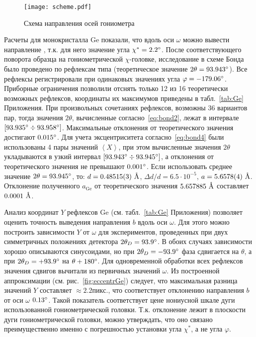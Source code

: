 \begin{figure}[ht!]
    \centering
    \texttt{[image: scheme.pdf]}
    \caption{Схема направления осей гониометра}%
    \label{fig:scheme}
\end{figure}

Расчеты для монокристалла Ge показали, что вдоль оси $\omega$ можно вывести направление , т.к. для него значение угла $\chi^\ast = 2.2^\circ$.
После соответствующего поворота образца на гониометрической $\chi$-головке, исследование в схеме Бонда было проведено по рефлексам типа  (теоретическое значение $2\theta = 93.943^\circ$).
Все рефлексы регистрировали при одинаковых значениях угла $\varphi = -179.06^\circ$.
Приборные ограничения позволили отснять только 12 из 16 теоретически возможных рефлексов, координаты их максимумов приведены в табл.~\ref{tab:Ge} Приложения.
При произвольных сочетаниях рефлексов, возможны 36 вариантов пар, тогда значения $2\theta$, вычисленные согласно~\ref{eq:bond2}, лежат в интервале $[93.935^\circ\div93.958^\circ]$.
Максимальные отклонения от теоретического значения достигают $0.015^\circ$.
Для учета эксцентриситета согласно~\ref{eq:bond4} были использованы 4 пары значений $\left<X\right>$, при этом вычисленные значения $2\theta$ укладываются в узкий интервал $[93.943^\circ\div93.945^\circ]$, а отклонения от теоретического значения не превышают $0.001^\circ$.
Если использовать среднее значение $2\theta = 93.945^\circ$, то: $d = 0.48515 (3)\ \text{\AA}$, $\Delta d / d = 6.5 \cdot 10^{-5}$, $a = 5.6578 (4)\ \text{\AA}$.
Отклонение полученного $a_\text{Ge}$ от теоретического значения $5.657885\ \text{\AA}$ составляет 
$0.0001\ \text{\AA}$.

Анализ координат $Y$ рефлексов Ge (см. табл.~\ref{tab:Ge} Приложения) позволяет оценить точность выведения направления $b$ вдоль оси $\omega$.
Для этого можно построить зависимости $Y$ от $\omega$ для экспериментов, проведенных при двух симметричных положениях детектора $2\theta_D = 93.9^\circ$.
В обоих случаях зависимости хорошо описываются синусоидами, но при $2\theta_D = -93.9^\circ$ фаза сдвигается на $\theta$, а при $2\theta_D = +93.9^\circ$ на $\theta + 180^\circ$.
Для одновременной обработки всех рефлексов значения сдвигов вычитали из первичных значений $\omega$.
Из построенной аппроксимации (см. рис.~\ref{fig:eccentrGe}) следует, что максимальная разница значений $Y$ составляет $\approx 2.2\unit{пикс.}$, что соответствует отклонению направления $b$ от оси $\omega$ $0.13^\circ$.
Такой показатель соответствует цене нониусной шкале дуги использованной гониометрической головки.
Т.к. отклонение лежит в плоскости дуги гониометрической головки, можно утверждать, что оно связано преимущественно именно с погрешностью установки угла $\chi^\ast$, а не угла $\varphi$.

